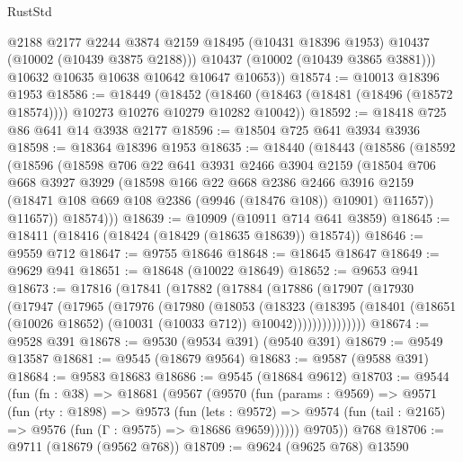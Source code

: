 \begin{lexlean}{RustStd}
\begin{coremodule}
            @2188
            @2177
            @2244
            @3874
            @2159
            @18495
            (@10431 @18396 @1953)
            @10437
            (@10002 (@10439 @3875 @2188)))
          @10437
          (@10002 (@10439 @3865 @3881)))
        @10632
        @10635
        @10638
        @10642
        @10647
        @10653))
@18574 := @10013 @18396 @1953
@18586 := @18449
    (@18452 (@18460 (@18463 (@18481 (@18496 (@18572 @18574)))) @10273 @10276 @10279 @10282 @10042))
@18592 := @18418 @725 @86 @641 @14 @3938 @2177
@18596 := @18504 @725 @641 @3934 @3936
@18598 := @18364 @18396 @1953
@18635 := @18440
    (@18443
      (@18586
        (@18592
          (@18596
            (@18598
              @706
              @22
              @641
              @3931
              @2466
              @3904
              @2159
              (@18504
                @706
                @668
                @3927
                @3929
                (@18598
                  @166
                  @22
                  @668
                  @2386
                  @2466
                  @3916
                  @2159
                  (@18471 @108 @669 @108 @2386 (@9946 (@18476 @108)) @10901)
                  @11657))
              @11657))
          @18574)))
@18639 := @10909 (@10911 @714 @641 @3859)
@18645 := @18411 (@18416 (@18424 (@18429 (@18635 @18639)) @18574))
@18646 := @9559 @712
@18647 := @9755 @18646
@18648 := @18645 @18647
@18649 := @9629 @941
@18651 := @18648 (@10022 @18649)
@18652 := @9653 @941
@18673 := @17816
    (@17841
      (@17882
        (@17884
          (@17886
            (@17907
              (@17930
                (@17947
                  (@17965
                    (@17976
                      (@17980
                        (@18053
                          (@18323
                            (@18395
                              (@18401
                                (@18651 (@10026 @18652) (@10031 (@10033 @712)) @10042)))))))))))))))
@18674 := @9528 @391
@18678 := @9530 (@9534 @391) (@9540 @391)
@18679 := @9549 @13587
@18681 := @9545 (@18679 @9564)
@18683 := @9587 (@9588 @391)
@18684 := @9583 @18683
@18686 := @9545 (@18684 @9612)
@18703 := @9544
    (fun (fn : @38) =>
    @18681
      (@9567
        (@9570
          (fun (params : @9569) =>
          @9571
            (fun (rty : @1898) =>
            @9573
              (fun (lets : @9572) =>
              @9574 (fun (tail : @2165) => @9576 (fun (Γ : @9575) => @18686 @9659))))))
        @9705))
    @768
@18706 := @9711 (@18679 (@9562 @768))
@18709 := @9624 (@9625 @768) @13590

\end{coremodule}
\end{lexlean}
